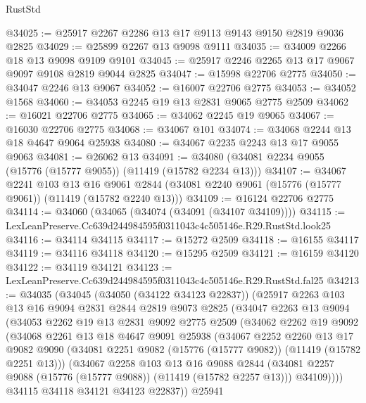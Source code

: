 \begin{lexlean}{RustStd}
\begin{coremodule}
@34025 := @25917 @2267 @2286 @13 @17 @9113 @9143 @9150 @2819 @9036 @2825
@34029 := @25899 @2267 @13 @9098 @9111
@34035 := @34009 @2266 @18 @13 @9098 @9109 @9101
@34045 := @25917 @2246 @2265 @13 @17 @9067 @9097 @9108 @2819 @9044 @2825
@34047 := @15998 @22706 @2775
@34050 := @34047 @2246 @13 @9067
@34052 := @16007 @22706 @2775
@34053 := @34052 @1568
@34060 := @34053 @2245 @19 @13 @2831 @9065 @2775 @2509
@34062 := @16021 @22706 @2775
@34065 := @34062 @2245 @19 @9065
@34067 := @16030 @22706 @2775
@34068 := @34067 @101
@34074 := @34068 @2244 @13 @18 @4647 @9064 @25938
@34080 := @34067 @2235 @2243 @13 @17 @9055 @9063
@34081 := @26062 @13
@34091 := @34080 (@34081 @2234 @9055 (@15776 (@15777 @9055)) (@11419 (@15782 @2234 @13)))
@34107 := @34067
    @2241
    @103
    @13
    @16
    @9061
    @2844
    (@34081 @2240 @9061 (@15776 (@15777 @9061)) (@11419 (@15782 @2240 @13)))
@34109 := @16124 @22706 @2775
@34114 := @34060 (@34065 (@34074 (@34091 (@34107 @34109))))
@34115 := LexLeanPreserve.Cc639d244984595f0311043c4c505146e.R29.RustStd.look25
@34116 := @34114 @34115
@34117 := @15272 @2509
@34118 := @16155 @34117
@34119 := @34116 @34118
@34120 := @15295 @2509
@34121 := @16159 @34120
@34122 := @34119 @34121
@34123 := LexLeanPreserve.Cc639d244984595f0311043c4c505146e.R29.RustStd.fal25
@34213 := @34035
    (@34045
      (@34050 (@34122 @34123 @22837))
      (@25917
        @2263
        @103
        @13
        @16
        @9094
        @2831
        @2844
        @2819
        @9073
        @2825
        (@34047
          @2263
          @13
          @9094
          (@34053
            @2262
            @19
            @13
            @2831
            @9092
            @2775
            @2509
            (@34062
              @2262
              @19
              @9092
              (@34068
                @2261
                @13
                @18
                @4647
                @9091
                @25938
                (@34067
                  @2252
                  @2260
                  @13
                  @17
                  @9082
                  @9090
                  (@34081 @2251 @9082 (@15776 (@15777 @9082)) (@11419 (@15782 @2251 @13)))
                  (@34067
                    @2258
                    @103
                    @13
                    @16
                    @9088
                    @2844
                    (@34081 @2257 @9088 (@15776 (@15777 @9088)) (@11419 (@15782 @2257 @13)))
                    @34109))))
            @34115
            @34118
            @34121
            @34123
            @22837))
        @25941

\end{coremodule}
\end{lexlean}
